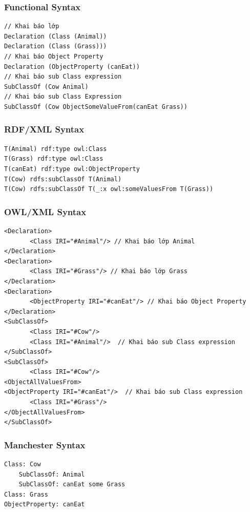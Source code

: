 \subsubsection{Functional Syntax}
\begin{verbatim}
// Khai báo lớp
Declaration (Class (Animal)) 
Declaration (Class (Grass))) 
// Khai báo Object Property
Declaration (ObjectProperty (canEat))  
// Khai báo sub Class expression
SubClassOf (Cow Animal)  
// Khai báo sub Class Expression
SubClassOf (Cow ObjectSomeValueFrom(canEat Grass))  
\end{verbatim}

\subsubsection{RDF/XML Syntax}
\begin{verbatim}
T(Animal) rdf:type owl:Class
T(Grass) rdf:type owl:Class
T(canEat) rdf:type owl:ObjectProperty
T(Cow) rdfs:subClassOf T(Animal) 
T(Cow) rdfs:subClassOf T(_:x owl:someValuesFrom T(Grass))
\end{verbatim}


\subsubsection{OWL/XML Syntax}
\begin{verbatim}
<Declaration>
       <Class IRI="#Animal"/> // Khai báo lớp Animal
</Declaration>
<Declaration>
       <Class IRI="#Grass"/> // Khai báo lớp Grass
</Declaration>
<Declaration>
       <ObjectProperty IRI="#canEat"/> // Khai báo Object Property 
</Declaration>
<SubClassOf>
       <Class IRI="#Cow"/>
       <Class IRI="#Animal"/>  // Khai báo sub Class expression
</SubClassOf>
<SubClassOf>
       <Class IRI="#Cow"/>
<ObjectAllValuesFrom>
<ObjectProperty IRI="#canEat"/>  // Khai báo sub Class expression
       <Class IRI="#Grass"/>
</ObjectAllValuesFrom>
</SubClassOf>
\end{verbatim}


\subsubsection{Manchester Syntax}

\begin{verbatim}
Class: Cow 
    SubClassOf: Animal 
    SubClassOf: canEat some Grass
Class: Grass
ObjectProperty: canEat
\end{verbatim}


